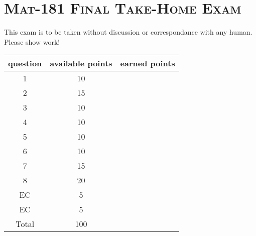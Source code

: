 \documentclass[12pt]{article}
\begin{document}
\thispagestyle{firstpage}

\section*{\textsc{Mat-181 Final Take-Home Exam}}

This exam is to be taken without discussion or correspondance with any human. Please show work!


\vfill
\Large 

\begin{tabular}{|c|c|c|} \hline
question & available points & earned points \\ \hline \hline
1 & 10 & \\ \hline
2 & 15 &  \\ \hline
3 & 10 &  \\ \hline
4 & 10 &  \\ \hline
5 & 10 &  \\ \hline
6 & 10 &  \\ \hline
7 & 15 &  \\ \hline
8 & 20 &  \\ \hline
EC & 5 &  \\ \hline
EC & 5 &  \\ \hline
Total & 100 & \\ \hline
\end{tabular}

\normalsize

\vfill

\newpage

\begin{enumerate}


\end{enumerate}
\end{document}
